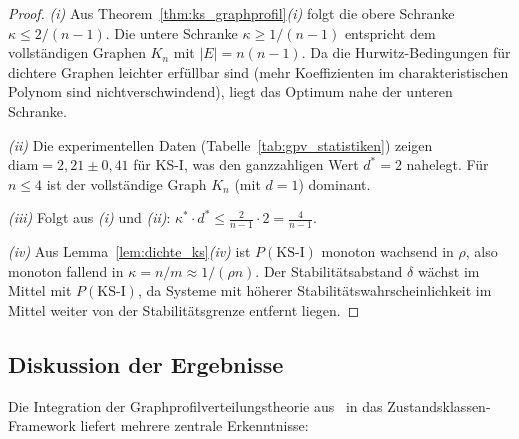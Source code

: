 \documentclass[a4paper, 12pt, twoside, openright]{report}
\theoremstyle{definition}
\theoremstyle{definition}
\newcommand{\KS}{\mathrm{KS}}
\begin{document}
\begin{proof}
\textit{(i)} Aus Theorem~\ref{thm:ks_graphprofil}\textit{(i)} folgt die obere Schranke
$\kappa \leq 2/(n-1)$. Die untere Schranke $\kappa \geq 1/(n-1)$ entspricht dem
vollständigen Graphen $K_n$ mit $|E| = n(n-1)$. Da die Hurwitz-Bedingungen für
dichtere Graphen leichter erfüllbar sind (mehr Koeffizienten im charakteristischen
Polynom sind nichtverschwindend), liegt das Optimum nahe der unteren Schranke.

\textit{(ii)} Die experimentellen Daten (Tabelle~\ref{tab:gpv_statistiken}) zeigen
$\mathrm{diam} = 2{,}21 \pm 0{,}41$ für KS-I, was den ganzzahligen Wert $d^* = 2$
nahelegt. Für $n \leq 4$ ist der vollständige Graph $K_n$ (mit $d = 1$) dominant.

\textit{(iii)} Folgt aus \textit{(i)} und \textit{(ii)}: $\kappa^* \cdot d^* \leq
\frac{2}{n-1} \cdot 2 = \frac{4}{n-1}$.

\textit{(iv)} Aus Lemma~\ref{lem:dichte_ks}\textit{(iv)} ist $P(\KS\text{-I})$
monoton wachsend in $\rho$, also monoton fallend in $\kappa = n/m \approx 1/(\rho n)$.
Der Stabilitätsabstand $\delta$ wächst im Mittel mit $P(\KS\text{-I})$, da Systeme
mit höherer Stabilitätswahrscheinlichkeit im Mittel weiter von der Stabilitätsgrenze
entfernt liegen.
\end{proof}

\subsection{Diskussion der Ergebnisse}

Die Integration der Graphprofilverteilungstheorie aus~\citep{epp2026graphs} in das
Zustandsklassen-Framework liefert mehrere zentrale Erkenntnisse:
\end{document}
